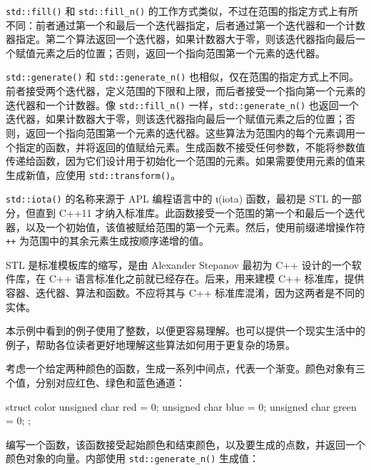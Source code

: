 
\verb|std::fill()| 和 \verb|std::fill_n()| 的工作方式类似，不过在范围的指定方式上有所不同：前者通过第一个和最后一个迭代器指定，后者通过第一个迭代器和一个计数器指定。第二个算法返回一个迭代器，如果计数器大于零，则该迭代器指向最后一个赋值元素之后的位置；否则，返回一个指向范围第一个元素的迭代器。

\verb|std::generate()| 和 \verb|std::generate_n()| 也相似，仅在范围的指定方式上不同。前者接受两个迭代器，定义范围的下限和上限，而后者接受一个指向第一个元素的迭代器和一个计数器。像 \verb|std::fill_n()| 一样，\verb|std::generate_n()| 也返回一个迭代器，如果计数器大于零，则该迭代器指向最后一个赋值元素之后的位置；否则，返回一个指向范围第一个元素的迭代器。这些算法为范围内的每个元素调用一个指定的函数，并将返回的值赋给元素。生成函数不接受任何参数，不能将参数值传递给函数，因为它们设计用于初始化一个范围的元素。如果需要使用元素的值来生成新值，应使用 \verb|std::transform()|。

\verb|std::iota()| 的名称来源于 APL 编程语言中的 ι(iota) 函数，最初是 STL 的一部分，但直到 C++11 才纳入标准库。此函数接受一个范围的第一个和最后一个迭代器，以及一个初始值，该值被赋给范围的第一个元素。然后，使用前缀递增操作符 \verb|++| 为范围中的其余元素生成按顺序递增的值。

\begin{myNotic}
STL 是标准模板库的缩写，是由 Alexander Stepanov 最初为 C++ 设计的一个软件库，在 C++ 语言标准化之前就已经存在。后来，用来建模 C++ 标准库，提供容器、迭代器、算法和函数。不应将其与 C++ 标准库混淆，因为这两者是不同的实体。
\end{myNotic}


本示例中看到的例子使用了整数，以便更容易理解。也可以提供一个现实生活中的例子，帮助各位读者更好地理解这些算法如何用于更复杂的场景。

考虑一个给定两种颜色的函数，生成一系列中间点，代表一个渐变。颜色对象有三个值，分别对应红色、绿色和蓝色通道：

\begin{cpp}
struct color
{
    unsigned char red   = 0;
    unsigned char blue  = 0;
    unsigned char green = 0;
};
\end{cpp}

编写一个函数，该函数接受起始颜色和结束颜色，以及要生成的点数，并返回一个颜色对象的向量。内部使用 \verb|std::generate_n()| 生成值：

